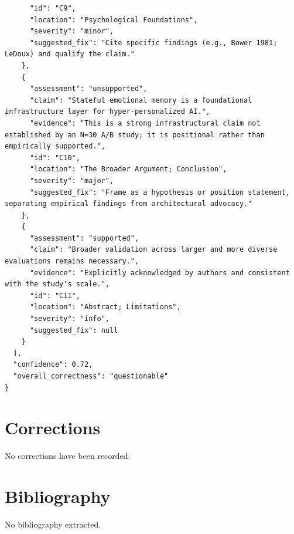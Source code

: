 \documentclass[11pt]{article}
\begin{document}
\begin{verbatim}
      "id": "C9",
      "location": "Psychological Foundations",
      "severity": "minor",
      "suggested_fix": "Cite specific findings (e.g., Bower 1981; LeDoux) and qualify the claim."
    },
    {
      "assessment": "unsupported",
      "claim": "Stateful emotional memory is a foundational infrastructure layer for hyper-personalized AI.",
      "evidence": "This is a strong infrastructural claim not established by an N=30 A/B study; it is positional rather than empirically supported.",
      "id": "C10",
      "location": "The Broader Argument; Conclusion",
      "severity": "major",
      "suggested_fix": "Frame as a hypothesis or position statement, separating empirical findings from architectural advocacy."
    },
    {
      "assessment": "supported",
      "claim": "Broader validation across larger and more diverse evaluations remains necessary.",
      "evidence": "Explicitly acknowledged by authors and consistent with the study's scale.",
      "id": "C11",
      "location": "Abstract; Limitations",
      "severity": "info",
      "suggested_fix": null
    }
  ],
  "confidence": 0.72,
  "overall_correctness": "questionable"
}
\end{verbatim}

\section*{Corrections}
No corrections have been recorded.

\section*{Bibliography}
No bibliography extracted.

% 
% 
\end{document}
